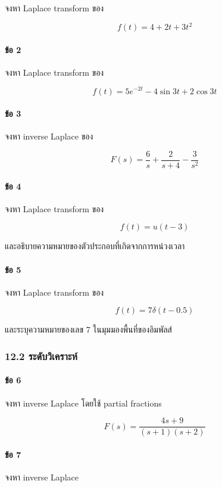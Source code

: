 จงหา Laplace transform ของ

\[
f(t)=4+2t+3t^2
\]

\paragraph{ข้อ 2}

จงหา Laplace transform ของ

\[
f(t)=5e^{-2t}-4\sin 3t+2\cos 3t
\]

\paragraph{ข้อ 3}

จงหา inverse Laplace ของ

\[
F(s)=\frac{6}{s}+\frac{2}{s+4}-\frac{3}{s^2}
\]

\paragraph{ข้อ 4}

จงหา Laplace transform ของ

\[
f(t)=u(t-3)
\]

และอธิบายความหมายของตัวประกอบที่เกิดจากการหน่วงเวลา

\paragraph{ข้อ 5}

จงหา Laplace transform ของ

\[
f(t)=7\delta(t-0.5)
\]

และระบุความหมายของเลข 7 ในมุมมองพื้นที่ของอิมพัลส์

\subsubsection{12.2 ระดับวิเคราะห์}

\paragraph{ข้อ 6}

จงหา inverse Laplace โดยใช้ partial fractions

\[
F(s)=\frac{4s+9}{(s+1)(s+2)}
\]

\paragraph{ข้อ 7}

จงหา inverse Laplace


